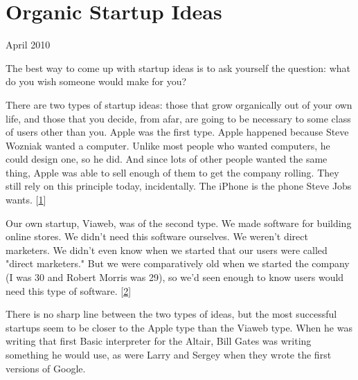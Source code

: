 \chapter{Organic Startup Ideas}


            
              
                


                  
                    April 2010

The best way to come up with startup
                    ideas is to ask yourself the question: what do you wish
                    someone would make for you?

There are two types
                    of startup ideas: those that grow organically out of your
                    own life, and those that you decide, from afar, are going to
                    be necessary to some class of users other than you. Apple
                    was the first type. Apple happened because Steve Wozniak
                    wanted a computer. Unlike most people who wanted computers,
                    he could design one, so he did. And since lots of other
                    people wanted the same thing, Apple was able to sell enough
                    of them to get the company rolling. They still rely on this
                    principle today, incidentally. The iPhone is the phone Steve
                    Jobs wants.
                    [\href{\#f1n}{1}]

Our own startup, Viaweb, was of the second
                    type. We made software for building online stores. We didn't
                    need this software ourselves. We weren't direct marketers.
                    We didn't even know when we started that our users were
                    called "direct marketers." But we were comparatively old
                    when we started the company (I was 30 and Robert Morris was
                    29), so we'd seen enough to know users would need this type
                    of software.
                    [\href{\#f2n}{2}]

There is no sharp line between the two types of
                    ideas, but the most successful startups seem to be closer to
                    the Apple type than the Viaweb type. When he was writing
                    that first Basic interpreter for the Altair, Bill Gates was
                    writing something he would use, as were Larry and Sergey
                    when they wrote the first versions of Google.


